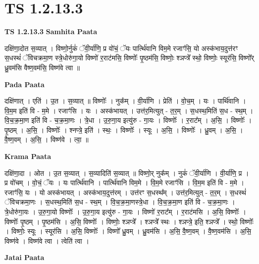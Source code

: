 \documentclass[17pt]{extarticle}
\begin{document}
\section{ TS 1.2.13.3 }

\textbf{TS 1.2.13.3 } \newline
\textbf{Samhita Paata} \newline

दक्षि॑णा॒दोत स॒व्यात् । विष्णो॒र्नुकं॑ ॅवी॒र्या॑णि॒ प्र वो॑चं॒ ॅयः पार्त्थि॑वानि विम॒मे रजाꣳ॑सि॒ यो अस्क॑भाय॒दुत्त॑रꣳ स॒धस्थं॑ ॅविचक्रमा॒ण स्त्रे॒धोरु॑गा॒यो विष्णो॑ र॒राट॑मसि॒ विष्णोः᳚ पृ॒ष्ठम॑सि॒ विष्णोः॒ श्ञप्त्रे᳚ स्थो॒ विष्णोः॒ स्यूर॑सि॒ विष्णो᳚र् ध्रु॒वम॑सि वैष्ण॒वम॑सि॒ विष्ण॑वे त्वा ॥ \newline

\textbf{Pada Paata} \newline

दक्षि॑णात् । एति॑ । उ॒त । स॒व्यात् ॥ विष्णोः᳚ । नुक᳚म् । वी॒र्या॑णि । प्रेति॑ । वो॒च॒म् । यः । पार्थि॑वानि । वि॒म॒म इति॑ वि - म॒मे । रजाꣳ॑सि । यः । अस्क॑भायत् । उत्त॑र॒मित्युत् - त॒र॒म् । स॒धस्थ॒मिति॑ स॒ध - स्थ॒म् । वि॒च॒क्र॒मा॒ण इति॑ वि - च॒क्र॒मा॒णः । त्रे॒धा । उ॒रु॒गा॒य इत्यु॑रु - गा॒यः । विष्णोः᳚ । र॒राट᳚म् । अ॒सि॒ । विष्णोः᳚ । पृ॒ष्ठम् । अ॒सि॒ । विष्णोः᳚ । श्नप्त्रे॒ इति॑ । स्थः॒ । विष्णोः᳚ । स्यूः । अ॒सि॒ । विष्णोः᳚ । ध्रु॒वम् । अ॒सि॒ । वै॒ष्ण॒वम् । अ॒सि॒ । विष्ण॑वे । त्वा॒ ॥  \newline


\textbf{Krama Paata} \newline

दक्षि॑णा॒दा । ओत । उ॒त स॒व्यात् । स॒व्यादिति॑ स॒व्यात् ॥ विष्णो॒र् नुक᳚म् । नुकं॑ ॅवी॒र्या॑णि । वी॒र्या॑णि॒ प्र । प्र वो॑चम् । वो॒चं॒ ॅयः । यः पार्त्थि॑वानि । पार्त्थि॑वानि विम॒मे । वि॒म॒मे रजाꣳ॑सि । वि॒म॒म इति॑ वि - म॒मे । रजाꣳ॑सि॒ यः । यो अस्क॑भायत् । अस्क॑भाय॒दुत्त॑रम् । उत्त॑रꣳ स॒धस्थ᳚म् । उत्त॑र॒मित्युत् - त॒र॒म् । स॒धस्थं॑ ॅविचक्रमा॒णः । स॒धस्थ॒मिति॑ स॒ध - स्थ॒म् । वि॒च॒क्र॒मा॒णस्त्रे॒धा । वि॒च॒क्र॒मा॒ण इति॑ वि - च॒क्र॒मा॒णः । त्रे॒धोरु॑गा॒यः । उ॒रु॒गा॒यो विष्णोः᳚ । उ॒रु॒गा॒य इत्यु॑रु - गा॒यः । विष्णो॑ र॒राट᳚म् । र॒राट॑मसि । अ॒सि॒ विष्णोः᳚ । विष्णोः᳚ पृ॒ष्ठम् । पृ॒ष्ठम॑सि । अ॒सि॒ विष्णोः᳚ । विष्णोः॒ श्ञप्त्रे᳚ । श्ञप्त्रे᳚ स्थः । श्ञप्त्रे॒ इति॒ श्ञप्त्रे᳚ । स्थो॒ विष्णोः᳚ । विष्णोः॒ स्यूः । स्यूर॑सि । अ॒सि॒ विष्णोः᳚ । विष्णो᳚ ध्रु॒वम् । ध्रु॒वम॑सि । अ॒सि॒ वै॒ष्ण॒वम् । वै॒ष्ण॒वम॑सि । अ॒सि॒ विष्ण॑वे । विष्ण॑वे त्वा । त्वेति॑ त्वा । \newline

\textbf{Jatai Paata} \newline
\end{document}
